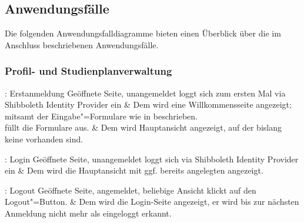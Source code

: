 \subsection{Anwendungsfälle}

Die folgenden Anwendungsfalldiagramme bieten einen Überblick über die im Anschluss beschriebenen Anwendungsfälle.

\begin{comment}
	\begin{center}
		\resizebox{\textwidth}{!} 
		{
			
		}
	\end{center}
\end{comment}

\subsubsection{Profil- und Studienplanverwaltung}

\begin{usecase}{: Erstanmeldung}
	{Geöffnete Seite, unangemeldet}
	 loggt sich zum ersten Mal via \gls{Shibboleth Identity Provider} ein
	& Dem  wird eine Willkommensseite angezeigt; mitsamt der Eingabe"=Formulare wie in  beschrieben.\\ 
	\hline
	 füllt die Formulare aus.
	& Dem  wird Hauptansicht angezeigt, auf der bislang keine  vorhanden sind. 	
\end{usecase}

\begin{usecase}{: Login}
	{Geöffnete Seite, unangemeldet}
	 loggt sich via \gls{Shibboleth Identity Provider} ein
	& Dem  wird die Hauptansicht mit ggf. bereits angelegten  angezeigt.
\end{usecase}

\begin{usecase}{: Logout}
	{Geöffnete Seite, angemeldet, beliebige Ansicht}
	 klickt auf den Logout"=Button.
	& Dem  wird die Login-Seite angezeigt, er wird bis zur nächsten Anmeldung nicht mehr als eingeloggt erkannt.
\end{usecase}

